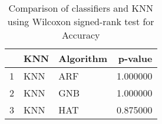 \begin{table}
\footnotesize
\caption{Comparison of classifiers and KNN using Wilcoxon signed-rank test for Accuracy}
\label{tab:KNN wilcoxon Accuracy comparison}
\begin{tabular}{lllr}
\hline
 & KNN & Algorithm & p-value \\
\hline
1 & KNN & ARF & 1.000000 \\
2 & KNN & GNB & 1.000000 \\
3 & KNN & HAT & 0.875000 \\
\hline
\end{tabular}
\end{table}
